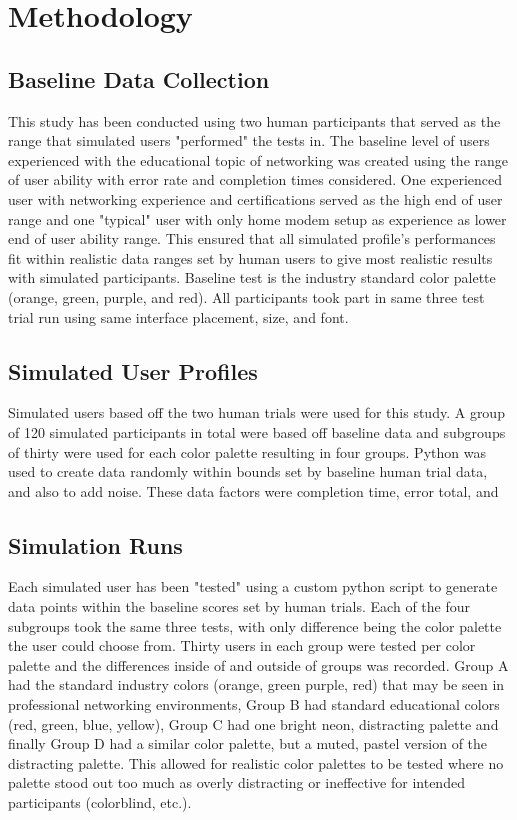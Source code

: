 \documentclass[acmlarge]{acmart}
\begin{document}
\section{Methodology}
\subsection{Baseline Data Collection}
This study has been conducted using two human participants that served as the range that simulated users "performed" the tests in. The baseline level of users experienced with the educational topic of networking was created using the range of user ability with error rate and completion times considered. One experienced user with networking experience and certifications served as the high end of user range and one "typical" user with only home modem setup as experience as lower end of user ability range. This ensured that all simulated profile's performances fit within realistic data ranges set by human users to give most realistic results with simulated participants. Baseline test is  the industry standard color palette (orange, green, purple, and red). All participants took part in same three test trial run using same interface placement, size, and font.

\subsection{Simulated User Profiles}
Simulated users based off the two human trials were used for this study. A group of 120 simulated participants in total were based off baseline data and subgroups of thirty were used for each color palette resulting in four groups.
Python was used to create data randomly within bounds set by baseline human trial data, and also to add noise. These data factors were completion time, error total, and 

\subsection{Simulation Runs}
Each simulated user has been "tested" using a custom python script to generate data points within the baseline scores set by human trials. Each of the four subgroups took the same three tests, with only difference being the color palette the user could choose from. Thirty users in each group were tested per color palette and the differences inside of and outside of groups was recorded. Group A had the standard industry colors (orange, green purple, red) that may be seen in professional networking environments, Group B had standard educational colors (red, green, blue, yellow), Group C had one bright neon, distracting palette and finally Group D had a similar color palette, but a muted, pastel version of the distracting palette. This allowed for realistic color palettes to be tested where no palette stood out too much as overly distracting or ineffective for intended participants (colorblind, etc.).
\end{document}
